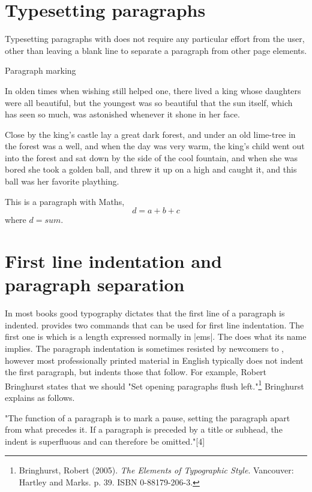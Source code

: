 \section{Typesetting paragraphs}

Typesetting paragraphs with \tex does not require any particular effort from the user, other than leaving a blank line to separate a paragraph from other page elements.

\begin{texexample}{Paragraph marking}{} 

In olden times when wishing
still helped one, there lived a
king whose daughters were all
beautiful, but the youngest was so
beautiful that the sun itself,
which has seen so much, was
astonished whenever it shone in
her face. 

Close by the king's
castle lay a great dark forest,
and under an old lime-tree in the
forest was a well, and when
the day was very warm, the
king's child went out into the 
forest and sat down by the side
of the cool fountain, and when she was bored she
took a golden ball, and threw it up on a high and caught it, and this
ball was her favorite plaything.

 This is a paragraph with Maths,
 \[d=a+b+c\]
 where $d=sum$.
\end{texexample}



\section{First line indentation and paragraph separation}

In most books good typography dictates that the first line of a paragraph is indented. \tex provides two commands that can be used for first line indentation. The first one is  which is a length expressed normally in |ems|. The  does what its name implies. The paragraph indentation is sometimes resisted by newcomers to \tex, however most professionally printed material in English typically does not indent the first paragraph, but indents those that follow. For example, Robert Bringhurst states that we should "Set opening paragraphs flush left."\footnote{Bringhurst, Robert (2005). \textit{The Elements of Typographic Style}. Vancouver: Hartley and Marks. p. 39. ISBN 0-88179-206-3.} Bringhurst explains as follows.

"The function of a paragraph is to mark a pause, setting the paragraph apart from what precedes it. If a paragraph is preceded by a title or subhead, the indent is superfluous and can therefore be omitted."[4]

